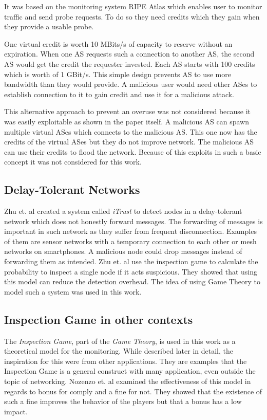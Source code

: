 \documentclass[thesis.tex]{subfiles}
\begin{document}
It was based on the monitoring system RIPE Atlas \cite{Ripenetworkcoordinationcentre.19.04.2018} which enables user to monitor traffic and send probe requests. To do so they need credits which they gain when they provide a usable probe.

One virtual credit is worth 10 MBits/s of capacity to reserve without an expiration. When one AS requests such a connection to another AS, the second AS would get the credit the requester invested. Each AS starts with 100 credits which is worth of 1 GBit/s. This simple design prevents AS to use more bandwidth than they would provide. A malicious user would need other ASes to establish connection to it to gain credit and use it for a malicious attack.

This alternative approach to prevent an overuse was not considered because it was easily exploitable as shown in the paper itself. A malicious AS can spawn multiple virtual ASes which connects to the malicious AS. This one now has the credits of the virtual ASes but they do not improve network. The malicious AS can use their credits to flood the network. Because of this exploits in such a basic concept it was not considered for this work.

\subsection{Delay-Tolerant Networks}
Zhu et. al \cite{Zhu.2014} created a system called \textit{iTrust} to detect nodes in a delay-tolerant network which does not honestly forward messages. The forwarding of messages is important in such network as they suffer from frequent disconnection. Examples of them are sensor networks with a temporary connection to each other or mesh networks on smartphones. A malicious node could drop messages instead of forwarding them as intended. Zhu et. al use the inspection game to calculate the probability to inspect a single node if it acts suspicious. They showed that using this model can reduce the detection overhead. The idea of using Game Theory to model such a system was used in this work.

\subsection{Inspection Game in other contexts}
The \textit{Inspection Game}, part of the \textit{Game Theory}, is used in this work as a theoretical model for the monitoring. While described later in detail, the inspiration for this were from other applications. They are examples that the Inspection Game is a general construct with many application, even outside the topic of networking. Nozenzo et. al \cite{Nosenzo.2014} examined the effectiveness of this model in regards to bonus for comply and a fine for not. They showed that the existence of such a fine improves the behavior of the players but that a bonus has a low impact. 
\end{document}
